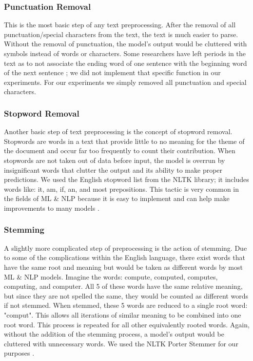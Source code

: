 \documentclass[twoside,twocolumn]{article}
\begin{document}
\subsubsection{Punctuation Removal}
This is the most basic step of any text preprocessing. After the removal of all punctuation/special characters from the text, the text is much easier to parse. Without the removal of punctuation, the model's output would be cluttered with symbols instead of words or characters. Some researchers have left periods in the text as to not associate the ending word of one sentence with the beginning word of the next sentence \cite{Markov:2006:FCW:1784815.1784819}; we did not implement that specific function in our experiments. For our experiments we simply removed all punctuation and special characters.

\subsubsection{Stopword Removal}
Another basic step of text preprocessing is the concept of stopword removal. Stopwords are words in a text that provide little to no meaning for the theme of the document and occur far too frequently to count their contribution. When stopwords are not taken out of data before input, the model is overrun by insignificant words that clutter the output and its ability to make proper predictions. We used the English stopword list from the NLTK library; it includes words like: it, am, if, an, and most prepositions. This tactic is very common in the fields of ML \& NLP because it is easy to implement and can help make improvements to many models \cite{rousseau2015text}.

\subsubsection{Stemming}
A slightly more complicated step of preprocessing is the action of stemming. Due to some of the complications within the English language, there exist words that have the same root and meaning but would be taken as different words by most ML \& NLP models. Imagine the words: compute, computed, computes, computing, and computer. All 5 of these words have the same relative meaning, but since they are not spelled the same, they would be counted as different words if not stemmed. When stemmed, these 5 words are reduced to a single root word: "comput". This allows all iterations of similar meaning to be combined into one root word. This process is repeated for all other equivalently rooted words. Again, without the addition of the stemming process, a model's output would be cluttered with unnecessary words. We used the NLTK Porter Stemmer for our purposes \cite{Markov:2006:FCW:1784815.1784819}.
\end{document}

